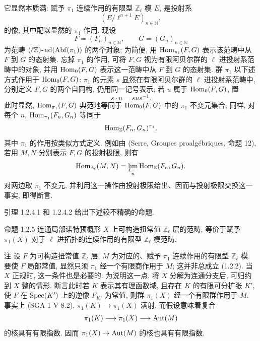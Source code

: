 \begin{prooftext}[证明]
它显然本质满: 赋予 \(\pi_1\) 连续作用的有限型 \(\mathbb Z_\ell\) 模 \(E\), 是投射系
\[
(E/\ell^{n+1}E)_{n\in\mathbb N},
\]
的像, 其中配以显然的 \(\pi_1\) 作用. 现设
\[
F=(F_n)_{n\in\mathbb N},\qquad G=(G_n)_{n\in\mathbb N}
\]
为范畴 \((\ell\mathbb Z)\text{-}\operatorname{ad}(\operatorname{Abf}(\pi_1))\) 的两个对象; 为简便, 用 \(\operatorname{Hom}_{\pi_1}(F,G)\) 表示该范畴中从 \(F\) 到 \(G\) 的态射集. 忘掉 \(\pi_1\) 的作用, 可将 \(F,G\) 视为有限阿贝尔群的 \(\ell\) 进投射系范畴中的对象, 并用 \(\operatorname{Hom}_0(F,G)\) 表示这一范畴中从 \(F\) 到 \(G\) 的态射集. 群 \(\pi_1\) 以下述方式作用于 \(\operatorname{Hom}_0(F,G)\): \(\pi_1\) 的元素 \(s\) 显然在有限阿贝尔群的 \(\ell\) 进投射系范畴中, 分别定义 \(F,G\) 的两个自同构, 仍用同一记号表示; 若 \(u\) 属于 \(\operatorname{Hom}_0(F,G)\), 置
\[
s\cdot u=sus^{-1}.
\]
此时显然, \(\operatorname{Hom}_{\pi_1}(F,G)\) 典范地等同于 \(\operatorname{Hom}_0(F,G)\) 中的 \(\pi_1\) 不变元集合; 同样, 对每个 \(n\), \(\operatorname{Hom}_{\pi_1}(F_n,G_n)\) 等同于
\[
\operatorname{Hom}_{\mathbb Z}(F_n,G_n)^{\pi_1},
\]
其中 \(\pi_1\) 的作用按类似方式定义. 例如由 (Serre, Groupes proalgébriques, 命题 12), 若用 \(M,N\) 分别表示 \(F,G\) 的投射极限, 则有
\[
\operatorname{Hom}_{\mathbb Z_\ell}(M,N)=\varprojlim_n\operatorname{Hom}_{\mathbb Z}(F_n,G_n).
\]
对两边取 \(\pi_1\) 不变元, 并利用这一操作由投射极限给出、因而与投射极限交换这一事实, 即得断言.
\end{prooftext}

引理 1.2.4.1 和 1.2.4.2 给出下述较不精确的命题.

\begin{statement}{命题 1.2.5}
连通局部诺特预概形 \(X\) 上可构造扭常值 \(\mathbb Z_\ell\) 层的范畴, 等价于赋予 \(\pi_1(X)\) 对于 \(\ell\) 进拓扑的连续作用的有限型 \(\mathbb Z_\ell\) 模范畴.
\end{statement}

\begin{statement}{注}
设 \(F\) 为可构造扭常值 \(\mathbb Z_\ell\) 层, \(M\) 为对应的、赋予 \(\pi_1\) 连续作用的有限型 \(\mathbb Z_\ell\) 模. 要使 \(F\) 局部常值, 显然只须 \(\pi_1\) 经一个有限商作用于 \(M\); 这并非总成立 (1.2.2). 当 \(X\) 正规时, 这一条件也是必要的. 为说明这一点, 将 \(X\) 分解为连通分支后, 可归约到 \(X\) 整的情形. 断言此时若 \(K\) 表示其有理函数域, 且存在 \(K\) 的有限可分扩张 \(K'\), 使 \(F\) 在 \(\operatorname{Spec}(K')\) 上的逆像 \(F_{K'}\) 为常值, 则群 \(\pi_1(X)\) 经一个有限群作用于 \(M\). 事实上 (SGA 1 V 8.2), \(\pi_1(K)\to\pi_1(X)\) 满射, 而假设意味着复合
\[
\pi_1(K)\longrightarrow \pi_1(X)\longrightarrow \operatorname{Aut}(M)
\]
的核具有有限指数. 因而 \(\pi_1(X)\to\operatorname{Aut}(M)\) 的核也具有有限指数.
\end{statement}

